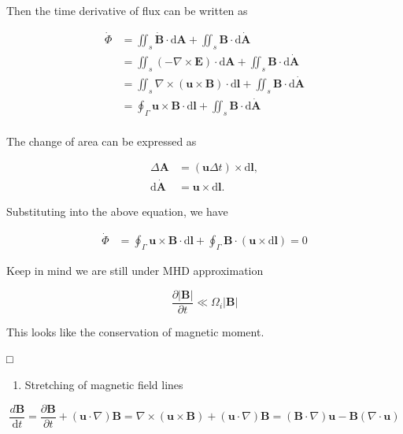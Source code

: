 \documentclass[
  notoc %
]{tufte-book}
\providecommand{\tightlist}{%
  \setlength{\itemsep}{0pt}\setlength{\parskip}{0pt}
}
\begin{document}
Then the time derivative of flux can be written as

\[
\begin{aligned}
\dot{\Phi}&=\iint_s \dot{\mathbf{B}}\cdot \mathrm{d}\mathbf{A} + \iint_s \mathbf{B}\cdot \mathrm{d}\dot{\mathbf{A}} \\
&=\iint_s (-\nabla\times\mathbf{E})\cdot\mathrm{d}\mathbf{A} + \iint_s \mathbf{B}\cdot \mathrm{d}\dot{\mathbf{A}} \\
&=\iint_s \nabla\times(\mathbf{u}\times\mathbf{B})\cdot\mathrm{d}\mathbf{l} + \iint_s \mathbf{B}\cdot \mathrm{d}\dot{\mathbf{A}} \\
&=\oint_\Gamma \mathbf{u}\times\mathbf{B}\cdot\mathrm{d}\mathbf{l} + \iint_s \mathbf{B}\cdot \mathrm{d}\dot{\mathbf{A}} \\
\end{aligned}
\]

The change of area can be expressed as

\[
\begin{aligned}
\Delta \mathbf{A}&=(\mathbf{u}\Delta t)\times\mathrm{d}\mathbf{l}, \\
\mathrm{d}\dot{\mathbf{A}}&=\mathbf{u}\times\mathrm{d}\mathbf{l}.
\end{aligned}
\]

Substituting into the above equation, we have

\[
\begin{aligned}
\dot{\Phi}&=\oint_\Gamma \mathbf{u}\times\mathbf{B}\cdot\mathrm{d}\mathbf{l} + \oint_\Gamma \mathbf{B}\cdot(\mathbf{u}\times\mathrm{d}\mathbf{l})=0
\end{aligned}
\]

Keep in mind we are still under MHD approximation

\[
\frac{\partial |\mathbf{B}|}{\partial t} \ll \Omega_i |\mathbf{B}|
\]

This looks like the conservation of magnetic moment.

□

\begin{enumerate}
\def\labelenumi{\arabic{enumi}.}
\setcounter{enumi}{1}
\tightlist
\item
  Stretching of magnetic field lines
\end{enumerate}

\[
\frac{d\mathbf{B}}{\mathrm{d}t}=\frac{\partial\mathbf{B}}{\partial t}+(\mathbf{u}\cdot\nabla)\mathbf{B}=\nabla\times(\mathbf{u}\times\mathbf{B})+(\mathbf{u}\cdot\nabla)\mathbf{B}
=(\mathbf{B}\cdot\nabla)\mathbf{u}-\mathbf{B}(\nabla\cdot\mathbf{u})
\]
\end{document}
